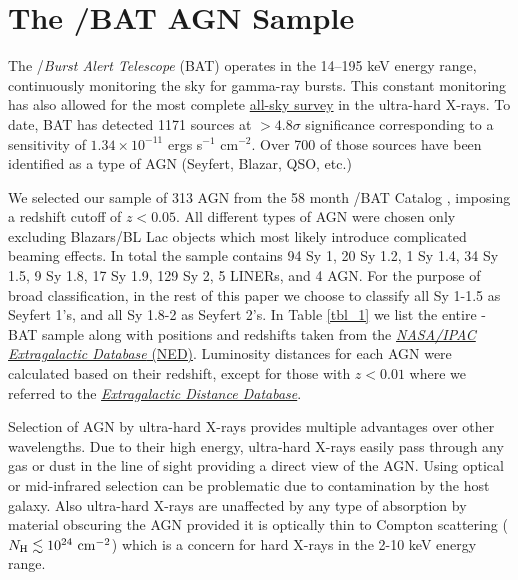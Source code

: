 \section{The \swift/BAT AGN Sample}\label{sample}
The  \swift/\textit{Burst Alert Telescope} (BAT) \cite{Barthelmy_2005,Gehrels_2004} operates in the 14--195 keV energy range, continuously monitoring the sky for gamma-ray bursts. This constant monitoring has also allowed for the most complete \href{https://swift.gsfc.nasa.gov/results/bs70mon/}{all-sky survey} in the ultra-hard X-rays. To date, BAT has detected 1171 sources at  $>4.8\sigma$ significance corresponding to a sensitivity of $1.34\times10^{-11}$ ergs s$^{-1}$ cm$^{-2}$. Over 700 of those sources have been identified as a type of AGN (Seyfert, Blazar, QSO, etc.)

We selected our sample of 313 AGN from the 58 month \swift/BAT Catalog \citep{Baumgartner:2012gf}, imposing a redshift cutoff of $z<0.05$. All different types of AGN were chosen only excluding Blazars/BL Lac objects which most likely introduce complicated beaming effects. In total the sample contains 94 Sy 1, 20 Sy 1.2, 1 Sy 1.4, 34 Sy 1.5, 9 Sy 1.8, 17 Sy 1.9, 129 Sy 2, 5 LINERs, and 4 AGN. For the purpose of broad classification, in the rest of this paper we choose to classify all Sy 1-1.5 as Seyfert 1's, and all Sy 1.8-2 as Seyfert 2's. In Table \ref{tbl_1} we list the entire \herschel{}-BAT sample along with positions and redshifts taken from the \href{http://ned.ipac.caltech.edu/}{\textit{NASA/IPAC Extragalactic Database} (NED)}. Luminosity distances for each AGN were calculated based on their redshift, except for those with $z < 0.01$ where we referred to the \href{http://edd.ifa.hawaii.edu/]}{\textit{Extragalactic Distance Database}}.

Selection of AGN by ultra-hard X-rays provides multiple advantages over other wavelengths. Due to their high energy, ultra-hard X-rays easily pass through any gas or dust in the line of sight providing a direct view of the AGN. Using optical or mid-infrared selection can be problematic due to contamination by the host galaxy. Also ultra-hard X-rays are unaffected by any type of absorption by material obscuring the AGN provided it is optically thin to Compton scattering ($N_{\rm{H}} \lesssim 10^{24}\,\, \rm{cm}^{-2}$) which is a concern for hard X-rays in the 2-10 keV energy range.